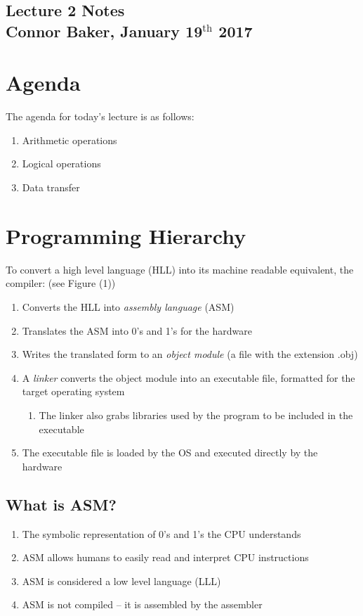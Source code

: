 \documentclass[12pt]{article}
\begin{document}
\begin{center}
  \subsection*{Lecture 2 Notes\\Connor Baker, January 19$^\text{th}$ 2017}
\end{center}



\section*{Agenda}
The agenda for today's lecture is as follows:
\begin{enumerate}
  \item Arithmetic operations
  \item Logical operations
  \item Data transfer
\end{enumerate}



\section{Programming Hierarchy}
To convert a high level language (HLL) into its machine readable equivalent, the compiler: (see Figure (1))
\begin{enumerate}
  \item Converts the HLL into \textit{assembly language} (ASM)
  \item Translates the ASM into 0's and 1's for the hardware
  \item Writes the translated form to an \textit{object module} (a file with the extension .obj)
  \item A \textit{linker} converts the object module into an executable file, formatted for the target operating system
  \begin{enumerate}
    \item The linker also grabs libraries used by the program to be included in the executable
  \end{enumerate}
  \item The executable file is loaded by the OS and executed directly by the hardware
\end{enumerate}



\subsection{What is ASM?}
\begin{enumerate}
  \item The symbolic representation of 0's and 1's the CPU understands
  \item ASM allows humans to easily read and interpret CPU instructions
  \item ASM is considered a low level language (LLL)
  \item ASM is not compiled -- it is assembled by the assembler
\end{enumerate}
\end{document}
